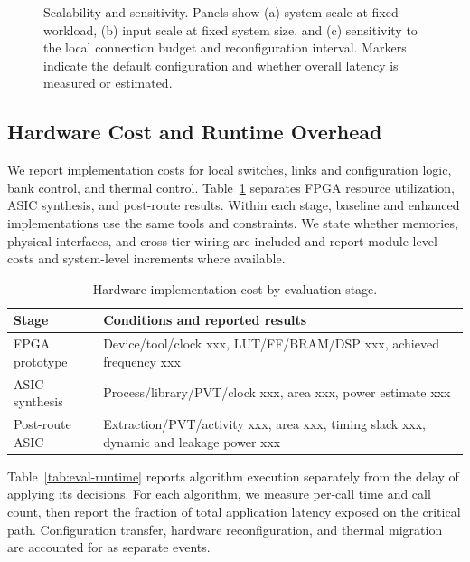 \documentclass[conference,10pt]{IEEEtran}
\newcommand{\Description}[1]{}
\begin{document}
\begin{figure}[t]
\centering
\fbox{\rule{0pt}{17mm}\rule{0.90\columnwidth}{0pt}}
\caption{Scalability and sensitivity. Panels show (a) system scale at fixed workload, (b) input scale at fixed system size, and (c) sensitivity to the local connection budget and reconfiguration interval. Markers indicate the default configuration and whether overall latency is measured or estimated.}
\Description{Reserved space for the scalability and parameter sweeps.}
\label{fig:eval-scale}
\end{figure}

\subsection{Hardware Cost and Runtime Overhead}

We report implementation costs for local switches, links and configuration logic, bank control, and thermal control. Table~\ref{tab:eval-cost} separates FPGA resource utilization, ASIC synthesis, and post-route results. Within each stage, baseline and enhanced implementations use the same tools and constraints. We state whether memories, physical interfaces, and cross-tier wiring are included and report module-level costs and system-level increments where available.

\begin{table}[t]
\caption{Hardware implementation cost by evaluation stage.}
\label{tab:eval-cost}
\centering\small
\begin{tabular}{@{}lp{}@{}}
\hline
Stage & Conditions and reported results \\
\hline
FPGA prototype & Device/tool/clock xxx, LUT/FF/BRAM/DSP xxx, achieved frequency xxx \\
ASIC synthesis & Process/library/PVT/clock xxx, area xxx, power estimate xxx \\
Post-route ASIC & Extraction/PVT/activity xxx, area xxx, timing slack xxx, dynamic and leakage power xxx \\
\hline
\end{tabular}
\end{table}

Table~\ref{tab:eval-runtime} reports algorithm execution separately from the delay of applying its decisions. For each algorithm, we measure per-call time and call count, then report the fraction of total application latency exposed on the critical path. Configuration transfer, hardware reconfiguration, and thermal migration are accounted for as separate events.
\end{document}
